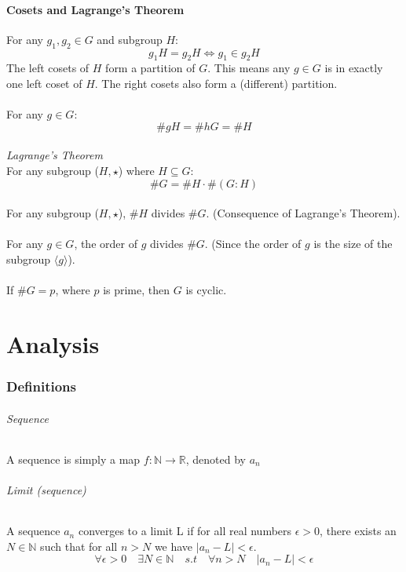 \documentclass{scrartcl}
\newcommand{\R}{\mathbb{R}}
\newcommand{\N}{\mathbb{N}}
\begin{document}
\subsection{Cosets and Lagrange's Theorem}
For any $ g_{1}, g_{2} \in G $ and subgroup $ H $:
\begin{equation}
g_{1}H = g_{2}H \Leftrightarrow g_{1} \in g_{2}H
\end{equation}
The left cosets of $ H $ form a partition of $ G $. This means any $ g \in G $ is in exactly one left coset of $ H $. The right cosets also form a (different) partition.
\\\\
For any $ g \in G $:
\begin{equation}
\#gH = \#hG = \#H
\end{equation}
\\
\textit{Lagrange's Theorem}
\\
For any subgroup ($ H, \star $) where $ H \subseteq G $:
\begin{equation}
\#G = \#H \cdot \#(G : H)
\end{equation}
\\
For any subgroup ($ H, \star $), $ \#H $ divides $ \#G $. (Consequence of Lagrange's Theorem).
\\\\
For any $ g \in G $, the order of $ g $ divides $ \#G $. (Since the order of $ g $ is the size of the subgroup $ \langle g \rangle $).
\\\\
If $ \#G = p $, where $ p $ is prime, then $ G $ is cyclic.

\newpage
\part{Analysis}

\section{Definitions}
\paragraph{Sequence}
A sequence is simply a map $ f: \N \to \R $, denoted by $ a_{n} $
\paragraph{Limit (sequence)}
A sequence $ a_{n} $ converges to a limit L if for all real numbers $ \epsilon > 0 $, there exists an $ N \in \N $ such that for all $ n > N $ we have $ |a_{n} - L| < \epsilon $.
\begin{equation}
\forall \epsilon > 0 \quad \exists N \in \N \quad s.t \quad \forall n > N \quad |a_{n} - L| < \epsilon
\end{equation}
\end{document}
